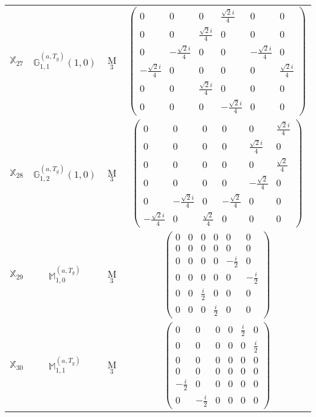 \documentclass[fleqn,10pt,landscape]{article}
\begin{document}
\begin{itemize}
\begin{center}
\begin{longtable}{c|c|c|c}
$ \mathbb{X}_{27} $ & $\mathbb{G}_{1,1}^{(a,T_{g})}(1,0)$ & M$_{3}$ & $\begin{pmatrix} 0 & 0 & 0 & \frac{\sqrt{2} i}{4} & 0 & 0 \\ 0 & 0 & \frac{\sqrt{2} i}{4} & 0 & 0 & 0 \\ 0 & - \frac{\sqrt{2} i}{4} & 0 & 0 & - \frac{\sqrt{2} i}{4} & 0 \\ - \frac{\sqrt{2} i}{4} & 0 & 0 & 0 & 0 & \frac{\sqrt{2} i}{4} \\ 0 & 0 & \frac{\sqrt{2} i}{4} & 0 & 0 & 0 \\ 0 & 0 & 0 & - \frac{\sqrt{2} i}{4} & 0 & 0 \end{pmatrix}$ \\
$ \mathbb{X}_{28} $ & $\mathbb{G}_{1,2}^{(a,T_{g})}(1,0)$ & M$_{3}$ & $\begin{pmatrix} 0 & 0 & 0 & 0 & 0 & \frac{\sqrt{2} i}{4} \\ 0 & 0 & 0 & 0 & \frac{\sqrt{2} i}{4} & 0 \\ 0 & 0 & 0 & 0 & 0 & \frac{\sqrt{2}}{4} \\ 0 & 0 & 0 & 0 & - \frac{\sqrt{2}}{4} & 0 \\ 0 & - \frac{\sqrt{2} i}{4} & 0 & - \frac{\sqrt{2}}{4} & 0 & 0 \\ - \frac{\sqrt{2} i}{4} & 0 & \frac{\sqrt{2}}{4} & 0 & 0 & 0 \end{pmatrix}$ \\
$ \mathbb{X}_{29} $ & $\mathbb{M}_{1,0}^{(a,T_{g})}$ & M$_{3}$ & $\begin{pmatrix} 0 & 0 & 0 & 0 & 0 & 0 \\ 0 & 0 & 0 & 0 & 0 & 0 \\ 0 & 0 & 0 & 0 & - \frac{i}{2} & 0 \\ 0 & 0 & 0 & 0 & 0 & - \frac{i}{2} \\ 0 & 0 & \frac{i}{2} & 0 & 0 & 0 \\ 0 & 0 & 0 & \frac{i}{2} & 0 & 0 \end{pmatrix}$ \\
$ \mathbb{X}_{30} $ & $\mathbb{M}_{1,1}^{(a,T_{g})}$ & M$_{3}$ & $\begin{pmatrix} 0 & 0 & 0 & 0 & \frac{i}{2} & 0 \\ 0 & 0 & 0 & 0 & 0 & \frac{i}{2} \\ 0 & 0 & 0 & 0 & 0 & 0 \\ 0 & 0 & 0 & 0 & 0 & 0 \\ - \frac{i}{2} & 0 & 0 & 0 & 0 & 0 \\ 0 & - \frac{i}{2} & 0 & 0 & 0 & 0 \end{pmatrix}$ \\

\end{longtable}
\end{center}
\end{itemize}
\end{document}

